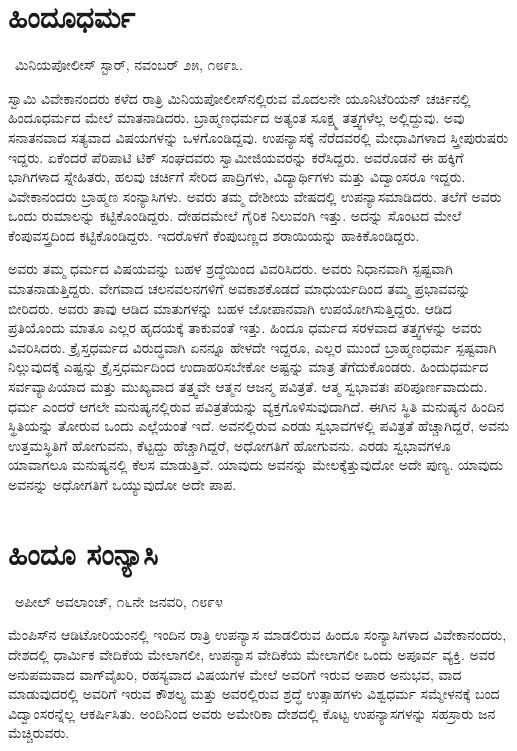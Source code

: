 \section*{ಹಿಂದೂಧರ್ಮ}

~\hfill{\fontsize{11pt}{13.75pt}\selectfont ಮಿನಿಯಪೋಲೀಸ್ ಸ್ಟಾರ್, ನವಂಬರ್ ೨೫, ೧೮೯೩.}

 ಸ್ವಾಮಿ ವಿವೇಕಾನಂದರು ಕಳೆದ ರಾತ್ರಿ ಮಿನಿಯಪೋಲೀಸ್‍ನಲ್ಲಿರುವ ಮೊದಲನೇ ಯೂನಿಟೆರಿಯನ್ ಚರ್ಚಿನಲ್ಲಿ ಹಿಂದೂಧರ್ಮದ ಮೇಲೆ ಮಾತನಾಡಿದರು. ಬ್ರಾಹ್ಮಣಧರ್ಮದ ಅತ್ಯಂತ ಸೂಕ್ಷ್ಮ ತತ್ತ್ವಗಳೆಲ್ಲ ಅಲ್ಲಿದ್ದುವು. ಅವು ಸನಾತನವಾದ ಸತ್ಯವಾದ ವಿಷಯಗಳನ್ನು ಒಳಗೊಂಡಿದ್ದವು. ಉಪನ್ಯಾಸಕ್ಕೆ ನೆರೆದವರಲ್ಲಿ ಮೇಧಾವಿಗಳಾದ ಸ್ತ್ರೀಪುರುಷರು ಇದ್ದರು. ಏಕೆಂದರೆ ಪೆರಿಪಾಟಿ ಟಿಕ್ ಸಂಘದವರು ಸ್ವಾಮೀಜಿಯವರನ್ನು ಕರೆಸಿದ್ದರು. ಅವರೊಡನೆ ಈ ಹಕ್ಕಿಗೆ ಭಾಗಿಗಳಾದ ಸ್ನೇಹಿತರು, ಹಲವು ಚರ್ಚಿಗೆ ಸೇರಿದ ಪಾದ್ರಿಗಳು, ವಿದ್ಯಾರ್ಥಿಗಳು ಮತ್ತು ವಿದ್ವಾಂಸರೂ ಇದ್ದರು. ವಿವೇಕಾನಂದರು ಬ್ರಾಹ್ಮಣ ಸಂನ್ಯಾಸಿಗಳು. ಅವರು ತಮ್ಮ ದೇಶೀಯ ವೇಷದಲ್ಲಿ ಉಪನ್ಯಾಸಮಾಡಿದರು. ತಲೆಗೆ ಅವರು ಒಂದು ರುಮಾಲನ್ನು ಕಟ್ಟಿಕೊಂಡಿದ್ದರು. ದೇಹದಮೇಲೆ ಗೈರಿಕ ನಿಲುವಂಗಿ ಇತ್ತು. ಅದನ್ನು ಸೊಂಟದ ಮೇಲೆ ಕೆಂಪುವಸ್ತ್ರದಿಂದ ಕಟ್ಟಿಕೊಂಡಿದ್ದರು. ಇದರೊಳಗೆ ಕೆಂಪುಬಣ್ಣದ ಶರಾಯಿಯನ್ನು ಹಾಕಿಕೊಂಡಿದ್ದರು. 

 ಅವರು ತಮ್ಮ ಧರ್ಮದ ವಿಷಯವನ್ನು ಬಹಳ ಶ್ರದ್ಧೆಯಿಂದ ವಿವರಿಸಿದರು. ಅವರು ನಿಧಾನವಾಗಿ ಸ್ಪಷ್ಟವಾಗಿ ಮಾತನಾಡುತ್ತಿದ್ದರು. ವೇಗವಾದ ಚಲನವಲನಗಳಿಗೆ ಅವಕಾಶಕೊಡದೆ ಮಾಧುರ್ಯದಿಂದ ತಮ್ಮ ಪ್ರಭಾವವನ್ನು ಬೀರಿದರು. ಅವರು ತಾವು ಆಡಿದ ಮಾತುಗಳನ್ನು ಬಹಳ ಜೋಪಾನವಾಗಿ ಉಪಯೋಗಿಸುತ್ತಿದ್ದರು. ಆಡಿದ ಪ್ರತಿಯೊಂದು ಮಾತೂ ಎಲ್ಲರ ಹೃದಯಕ್ಕೆ ತಾಕುವಂತೆ ಇತ್ತು. ಹಿಂದೂ ಧರ್ಮದ ಸರಳವಾದ ತತ್ತ್ವಗಳನ್ನು ಅವರು ವಿವರಿಸಿದರು. ಕ್ರೈಸ್ತಧರ್ಮದ ವಿರುದ್ಧವಾಗಿ ಏನನ್ನೂ ಹೇಳದೇ ಇದ್ದರೂ, ಎಲ್ಲರ ಮುಂದೆ ಬ್ರಾಹ್ಮಣಧರ್ಮ ಸ್ಪಷ್ಟವಾಗಿ ನಿಲ್ಲುವುದಕ್ಕೆ ಎಷ್ಟನ್ನು ಕ್ರೈಸ್ತಧರ್ಮದಿಂದ ಉದಾಹರಿಸಬೇಕೋ ಅಷ್ಟನ್ನು ಮಾತ್ರ ತೆಗೆದುಕೊಂಡರು. ಹಿಂದುಧರ್ಮದ ಸರ್ವವ್ಯಾಪಿಯಾದ ಮತ್ತು ಮುಖ್ಯವಾದ ತತ್ತ್ವವೇ ಆತ್ಮನ ಆಜನ್ಮ ಪವಿತ್ರತೆ. ಆತ್ಮ ಸ್ವಭಾವತಃ ಪರಿಪೂರ್ಣವಾದುದು. ಧರ್ಮ ಎಂದರೆ ಆಗಲೇ ಮನುಷ್ಯನಲ್ಲಿರುವ ಪವಿತ್ರತೆಯನ್ನು ವ್ಯಕ್ತಗೊಳಿಸುವುದಾಗಿದೆ. ಈಗಿನ ಸ್ಥಿತಿ ಮನುಷ್ಯನ ಹಿಂದಿನ ಸ್ಥಿತಿಯನ್ನು ತೋರುವ ಒಂದು ಎಲ್ಲೆಯಂತೆ ಇದೆ. ಅವನಲ್ಲಿರುವ ಎರಡು ಸ್ವಭಾವಗಳಲ್ಲಿ ಪವಿತ್ರತೆ ಹೆಚ್ಚಾಗಿದ್ದರೆ, ಅವನು ಉತ್ತಮಸ್ಥಿತಿಗೆ ಹೋಗುವನು, ಕೆಟ್ಟದ್ದು ಹೆಚ್ಚಾಗಿದ್ದರೆ, ಅಧೋಗತಿಗೆ ಹೋಗುವನು. ಎರಡು ಸ್ವಭಾವಗಳೂ ಯಾವಾಗಲೂ ಮನುಷ್ಯನಲ್ಲಿ ಕೆಲಸ ಮಾಡುತ್ತಿವೆ. ಯಾವುದು ಅವನನ್ನು ಮೇಲಕ್ಕೆತ್ತುವುದೋ ಅದೇ ಪುಣ್ಯ. ಯಾವುದು ಅವನನ್ನು ಅಧೋಗತಿಗೆ ಒಯ್ಯುವುದೋ ಅದೇ ಪಾಪ.


\section*{ಹಿಂದೂ ಸಂನ್ಯಾಸಿ}

~\hfill{\fontsize{11pt}{13.75pt}\selectfont ಅಪೀಲ್ ಅವಲಾಂಚ್, ೧೬ನೇ ಜನವರಿ, ೧೮೯೪}

 ಮೆಂಪಿಸ್‍ನ ಆಡಿಟೋರಿಯಂನಲ್ಲಿ ಇಂದಿನ ರಾತ್ರಿ ಉಪನ್ಯಾಸ ಮಾಡಲಿರುವ ಹಿಂದೂ ಸಂನ್ಯಾಸಿಗಳಾದ ವಿವೇಕಾನಂದರು, ದೇಶದಲ್ಲಿ ಧಾರ್ಮಿಕ ವೇದಿಕೆಯ ಮೇಲಾಗಲೀ, ಉಪನ್ಯಾಸ ವೇದಿಕೆಯ ಮೇಲಾಗಲೀ ಒಂದು ಅಪೂರ್ವ ವ್ಯಕ್ತಿ. ಅವರ ಅನುಪಮವಾದ ವಾಗ್‍ವೈಖರಿ, ರಹಸ್ಯವಾದ ವಿಷಯಗಳ ಮೇಲೆ ಅವರಿಗೆ ಇರುವ ಅಪಾರ ಅನುಭವ, ವಾದ ಮಾಡುವುದರಲ್ಲಿ ಅವರಿಗೆ ಇರುವ ಕೌಶಲ್ಯ ಮತ್ತು ಅವರಲ್ಲಿರುವ ಶ್ರದ್ಧೆ ಉತ್ಸಾಹಗಳು ವಿಶ್ವಧರ್ಮ ಸಮ್ಮೇಳನಕ್ಕೆ ಬಂದ ವಿದ್ವಾಂಸರನ್ನೆಲ್ಲ ಆಕರ್ಷಿಸಿತು. ಅಂದಿನಿಂದ ಅವರು ಅಮೇರಿಕಾ ದೇಶದಲ್ಲಿ ಕೊಟ್ಟ ಉಪನ್ಯಾಸಗಳನ್ನು ಸಹಸ್ರಾರು ಜನ ಮೆಚ್ಚಿರುವರು. 

